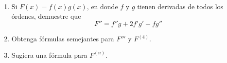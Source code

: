 \setcounter{enumi}{49}
\item 
\begin{enumerate}
    \item[(a)] Si $F(x) = f(x)g(x)$, en donde $f$ y $g$ tienen derivadas de todos los órdenes, demuestre que
    $$F'' = f''g + 2f'g' + fg''$$
    \item[(b)] Obtenga fórmulas semejantes para $F'''$ y $F^{(4)}$.
    \item[(c)] Sugiera una fórmula para $F^{(n)}$.
\end{enumerate}
